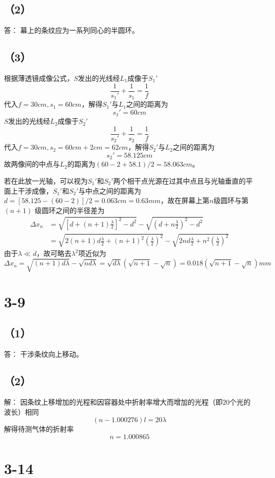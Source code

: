 \documentclass[10pt,a4paper]{article}
\begin{document}
\subsection*{（2）}答：
幕上的条纹应为一系列同心的半圆环。
\subsection*{（3）}
根据薄透镜成像公式，$S$发出的光线经$L_1$成像于$S_1'$
\[
\frac{1}{s_1'} + \frac{1}{s_1} = \frac{1}{f}
\]
代入$f = 30cm, s_1 = 60cm$，解得$S_1'$与$L_1$之间的距离为
\[
s_1' = 60cm
\]
$S$发出的光线经$L_2$成像于$S_2'$
\[
\frac{1}{s_2'} + \frac{1}{s_2} = \frac{1}{f}
\]
代入$f = 30cm, s_2 = 60cm + 2cm = 62cm$，解得$S_2'$与$L_2$之间的距离为
\[
s_2' = 58.125cm
\]
故两像间的中点与$L_2$的距离为$(60 - 2 + 58.1) / 2 = 58.063cm$。

若在此放一光轴，可以视为$S_1'$和$S_2'$两个相干点光源在过其中点且与光轴垂直的平面上干涉成像，$S_1'$和$S_2'$与中点之间的距离为$d = [58.125 - (60 - 2)] / 2 = 0.063cm = 0.63mm$，故在屏幕上第$n$级圆环与第$(n + 1)$ 级圆环之间的半径差为
\begin{align*}
\Delta x_n &= \sqrt{[d + (n + 1)\frac{\lambda}{2}]^2 - d^2} - \sqrt{(d + n\frac{\lambda}{2})^2 - d^2}\\
&= \sqrt{2(n + 1)d\frac{\lambda}{2} + (n + 1)^2(\frac{\lambda}{2})^2} - \sqrt{2nd\frac{\lambda}{2} + n^2(\frac{\lambda}{2})^2}
\end{align*}
由于$\lambda\ll d$，故可略去$\lambda^2$项近似为
\[
\Delta x_n = \sqrt{(n + 1)d\lambda} - \sqrt{nd\lambda} = \sqrt{d\lambda}(\sqrt{n + 1} - \sqrt{n}) = 0.018(\sqrt{n + 1} - \sqrt{n})mm
\]
\section*{3-9}
\subsection*{（1）}答：
干涉条纹向上移动。
\subsection*{（2）}解：
因条纹上移增加的光程和因容器处中折射率增大而增加的光程（即$20$个光的波长）相同
\[
(n - 1.000276)l = 20\lambda
\]
解得待测气体的折射率
\[
n = 1.000865
\]
\section*{3-14}
\end{document}
